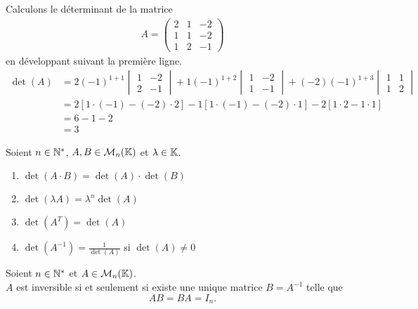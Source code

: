 \begin{example}
	Calculons le déterminant de la matrice 
	\begin{align*}
		A = 
		\begin{pmatrix}
		2 & 1 & -2 \\
		1 & 1 & -2 \\
		1 & 2 & -1
		\end{pmatrix}
	\end{align*}
	en développant suivant la première ligne.
	\begin{align*}
		\det(A) &= 2 (-1)^{1+1} 
		\begin{vmatrix}
			1 & -2 \\
			2 & -1	
		\end{vmatrix}			
		+ 1 (-1)^{1 + 2}
		\begin{vmatrix}
			1 & -2 \\
			1 & -1
		\end{vmatrix}
		+ (-2) (-1)^{1 + 3}
		\begin{vmatrix}
			1 & 1 \\
			1 & 2
		\end{vmatrix}
		\\
		&=
		2[1 \cdot (-1) - (-2) \cdot 2] -1[1 \cdot (-1) - (-2) \cdot 1] -2 [1 \cdot 2 - 1 \cdot 1]
		\\
		&= 6 - 1 - 2 \\
		&= 3
	\end{align*}
\end{example}

\begin{proposition}
	Soient $n \in \mathbb{N}^*$, $A, B \in \mathcal{M}_n(\mathbb{K})$ et $\lambda \in \mathbb{K}$.
	\begin{multicols}{2}
	    \begin{enumerate}
		\item $\det(A \cdot B) = \det(A) \cdot \det(B)$
		\item $\det(\lambda A) = \lambda^n \det(A)$
		\item $\det(A^T) = \det(A)$
		\item $\det(A^{-1}) = \frac{1}{\det(A)}$ si $\det(A) \neq 0$
	\end{enumerate}
	\end{multicols}
\end{proposition}

\begin{definition}
	Soient $n \in \mathbb{N}^*$ et $A \in \mathcal{M}_n(\mathbb{K})$.
	\\
	$A$ est inversible si et seulement si existe une unique matrice $B = A^{-1}$ telle que 
	\[AB = BA = I_n.\]
\end{definition}

